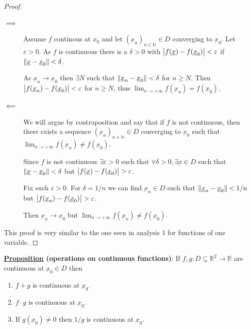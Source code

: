 \documentclass[10pt]{extarticle}
\newcommand{\R}{\mathbb{R}}
\newcommand{\N}{\mathbb{N}}
\newcommand{\munderbar}[1]{\underbar{\ensuremath{#1}}}
\newcommand{\skiplineafterproof}{$ $\par\nobreak\ignorespaces}
\begin{document}
\begin{proof}
    \skiplineafterproof
    \begin{description}
        \item[$\implies$]
            Assume $f$ continous at $x_0$ and let $\left(\munderbar{x}_n\right)_{n \in \N} \in D$ converging to $\munderbar{x}_0$.
            Let $\varepsilon > 0$.
            As $f$ is continuous there is a $\delta > 0$ with $\abs{f(\munderbar{x}) - f(\munderbar{x}_0)} < \varepsilon$ if $\norm{\munderbar{x} - \munderbar{x}_0} < \delta$.

            As $\munderbar{x}_n \to \munderbar{x}_0$ then $\exists N$ such that $\norm{\munderbar{x}_n - \munderbar{x}_0} < \delta$ for $n \geq N$.
            Then $\abs{f(\munderbar{x}_n) - f(\munderbar{x}_0)} < \varepsilon$ for $n \geq N$, thus $\lim_{n \to +\infty} f(\munderbar{x}_n) = f(\munderbar{x}_0)$.

        \item[$\impliedby$]
            We will argue by contraposition and say that if $f$ is not continuous, then there exists a sequence $\left(\munderbar{x}_n\right)_{n \in \N} \in D$ converging to $\munderbar{x}_0$ such that $\lim_{n \to +\infty} f(\munderbar{x}_n) \neq f(\munderbar{x}_0)$.

            Since $f$ is not continuous $\exists \varepsilon > 0$ such that $\forall \delta > 0, \exists \munderbar{x} \in D$ such that $\norm{\munderbar{x} - \munderbar{x}_0} < \delta$ but $\abs{f(\munderbar{x}) - f(\munderbar{x}_0)} > \varepsilon$.

            Fix such $\varepsilon > 0$. For $\delta = 1/n$ we can find $\munderbar{x}_n \in D$ such that $\norm{\munderbar{x}_n - \munderbar{x}_0} < 1/n$ but $\abs{f(\munderbar{x}_n) - f(\munderbar{x}_0)} > \varepsilon$.

            Then $\munderbar{x}_n \to \munderbar{x}_0$ but $\lim_{n \to +\infty} f(\munderbar{x}_n) \neq f(\munderbar{x}_0)$.
    \end{description}

    This proof is very similar to the one seen in analysis 1 for functions of one variable.
\end{proof}

\textbf{\underline{Proposition} (operations on continuous functions)}:
If $f, g: D \subseteq \R^2 \to \R$ are continuous at $\munderbar{x}_0 \in D$ then
\begin{enumerate}[label=\roman*.]
    \item $f + g$ is continuous at $\munderbar{x}_0$.
    \item $f \cdot g$ is continuous at $\munderbar{x}_0$.
    \item If $g(\munderbar{x}_0) \neq 0$ then $1/g$ is continuous at $\munderbar{x}_0$.
\end{enumerate}
\end{document}

